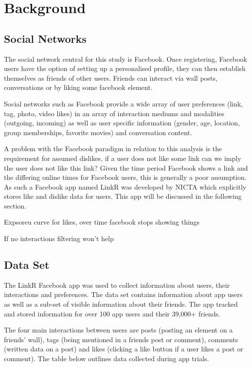 
\chapter{Background}
\label{cha:back}

\section{Social Networks}
\label{sec:sn}

The social network central for this study is Facebook. Once registering, Facebook users have the option of setting up a personalised profile, they can then establish
 themselves as friends of other users. Friends can interact via wall posts, conversations or by liking some facebook element.

Social networks such as Facebook provide a wide array of user preferences (link, tag, photo, video likes) in an array of interaction mediums and modalities 
(outgoing, incoming) as well as user specific information (gender, age, location, group memberships, favorite movies) and conversation content.

A problem with the Facebook paradigm in relation to this analysis is the requirement for assumed dislikes, if a user does not like some link can we 
imply the user does not like this link? Given the time period Facebook shows a link and the differing online times for Facebook users, this is generally 
a poor assumption. As such a Facebook app named LinkR was developed by NICTA which explicitly stores like and dislike data for users. This app will 
be discussed in the following section.

Expsoreu curve for likes, over time facebook stops showing things

If no interactions filtering won't help

\section{Data Set}
\label{sec:data}

The LinkR Facebook app was used to collect information about users, their interactions and preferences. The data set contains information about app users as 
well as a sub-set of visible information about their friends. The app tracked and stored information for over 100 app users and their 39,000+ friends.

The four main interactions between users are posts (posting an element on a friends' wall), tags (being mentioned in a friends post or comment), 
 comments (written data on a post) and likes (clicking a like button if a user likes a post or comment). The table below outlines data collected during 
 app trials.


